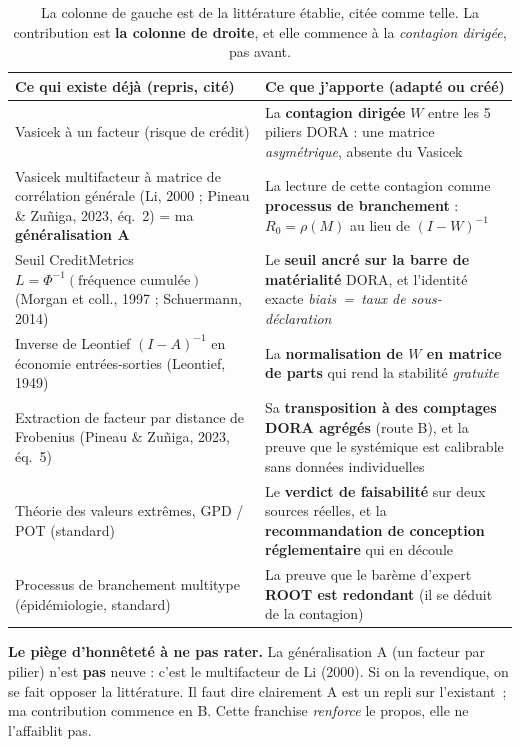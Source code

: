 \documentclass[11pt,a4paper]{article}
\begin{document}
\begin{table}[htbp]\centering\small
\renewcommand{\arraystretch}{1.3}
\begin{tabularx}{\textwidth}{@{}>{\raggedright\arraybackslash}p{4.6cm} >{\raggedright\arraybackslash}X@{}}
\toprule
\textbf{Ce qui existe déjà (repris, cité)} & \textbf{Ce que j'apporte (adapté ou créé)} \\
\midrule
Vasicek à un facteur (risque de crédit) & La \textbf{contagion dirigée} $W$ entre les 5 piliers DORA : une matrice \emph{asymétrique}, absente du Vasicek \\
\addlinespace[2pt]
Vasicek multifacteur à matrice de corrélation générale (Li, 2000 ; Pineau \& Zuñiga, 2023, éq.~2) = ma \textbf{généralisation A} & La lecture de cette contagion comme \textbf{processus de branchement} : $R_0=\rho(M)$ au lieu de $(I-W)^{-1}$ \\
\addlinespace[2pt]
Seuil CreditMetrics $L=\Phi^{-1}(\text{fréquence cumulée})$ (Morgan et coll., 1997 ; Schuermann, 2014) & Le \textbf{seuil ancré sur la barre de matérialité} DORA, et l'identité exacte \emph{biais~=~taux de sous-déclaration} \\
\addlinespace[2pt]
Inverse de Leontief $(I-A)^{-1}$ en économie entrées-sorties (Leontief, 1949) & La \textbf{normalisation de $W$ en matrice de parts} qui rend la stabilité \emph{gratuite} \\
\addlinespace[2pt]
Extraction de facteur par distance de Frobenius (Pineau \& Zuñiga, 2023, éq.~5) & Sa \textbf{transposition à des comptages DORA agrégés} (route B), et la preuve que le systémique est calibrable sans données individuelles \\
\addlinespace[2pt]
Théorie des valeurs extrêmes, GPD / POT (standard) & Le \textbf{verdict de faisabilité} sur deux sources réelles, et la \textbf{recommandation de conception réglementaire} qui en découle \\
\addlinespace[2pt]
Processus de branchement multitype (épidémiologie, standard) & La preuve que le barème d'expert \textbf{ROOT est redondant} (il se déduit de la contagion) \\
\bottomrule
\end{tabularx}
\caption{La colonne de gauche est de la littérature établie, citée comme telle. La contribution
est \textbf{la colonne de droite}, et elle commence à la \emph{contagion dirigée}, pas avant.}
\end{table}

\begin{attention}
\textbf{Le piège d'honnêteté à ne pas rater.} La généralisation A (un facteur par pilier) n'est
\textbf{pas} neuve : c'est le multifacteur de Li (2000). Si on la revendique, on se fait opposer
la littérature. Il faut dire clairement \og{}A est un repli sur l'existant~; ma contribution
commence en B\fg{}. Cette franchise \emph{renforce} le propos, elle ne l'affaiblit pas.
\end{attention}
\end{document}
